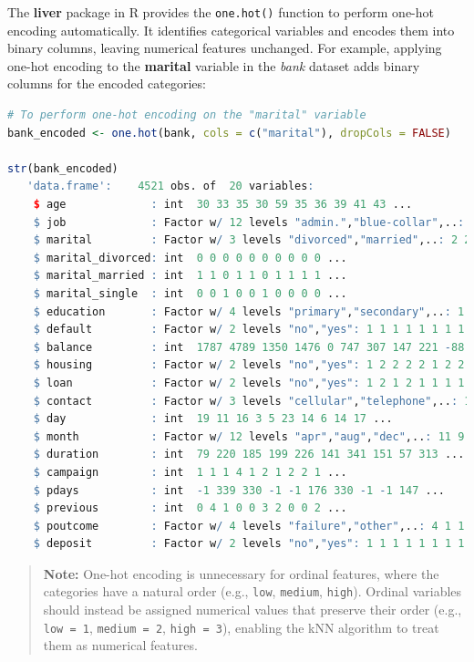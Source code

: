 \documentclass[
]{book}
\newcommand{\passthrough}[1]{#1}
\theoremstyle{definition}
\theoremstyle{definition}
\theoremstyle{definition}
\theoremstyle{definition}
\theoremstyle{remark}
\begin{document}
The \textbf{liver} package in R provides the \passthrough{\lstinline!one.hot()!} function to perform one-hot encoding automatically. It identifies categorical variables and encodes them into binary columns, leaving numerical features unchanged. For example, applying one-hot encoding to the \textbf{marital} variable in the \emph{bank} dataset adds binary columns for the encoded categories:

\begin{lstlisting}[language=R]
# To perform one-hot encoding on the "marital" variable
bank_encoded <- one.hot(bank, cols = c("marital"), dropCols = FALSE)

str(bank_encoded)
   'data.frame':    4521 obs. of  20 variables:
    $ age             : int  30 33 35 30 59 35 36 39 41 43 ...
    $ job             : Factor w/ 12 levels "admin.","blue-collar",..: 11 8 5 5 2 5 7 10 3 8 ...
    $ marital         : Factor w/ 3 levels "divorced","married",..: 2 2 3 2 2 3 2 2 2 2 ...
    $ marital_divorced: int  0 0 0 0 0 0 0 0 0 0 ...
    $ marital_married : int  1 1 0 1 1 0 1 1 1 1 ...
    $ marital_single  : int  0 0 1 0 0 1 0 0 0 0 ...
    $ education       : Factor w/ 4 levels "primary","secondary",..: 1 2 3 3 2 3 3 2 3 1 ...
    $ default         : Factor w/ 2 levels "no","yes": 1 1 1 1 1 1 1 1 1 1 ...
    $ balance         : int  1787 4789 1350 1476 0 747 307 147 221 -88 ...
    $ housing         : Factor w/ 2 levels "no","yes": 1 2 2 2 2 1 2 2 2 2 ...
    $ loan            : Factor w/ 2 levels "no","yes": 1 2 1 2 1 1 1 1 1 2 ...
    $ contact         : Factor w/ 3 levels "cellular","telephone",..: 1 1 1 3 3 1 1 1 3 1 ...
    $ day             : int  19 11 16 3 5 23 14 6 14 17 ...
    $ month           : Factor w/ 12 levels "apr","aug","dec",..: 11 9 1 7 9 4 9 9 9 1 ...
    $ duration        : int  79 220 185 199 226 141 341 151 57 313 ...
    $ campaign        : int  1 1 1 4 1 2 1 2 2 1 ...
    $ pdays           : int  -1 339 330 -1 -1 176 330 -1 -1 147 ...
    $ previous        : int  0 4 1 0 0 3 2 0 0 2 ...
    $ poutcome        : Factor w/ 4 levels "failure","other",..: 4 1 1 4 4 1 2 4 4 1 ...
    $ deposit         : Factor w/ 2 levels "no","yes": 1 1 1 1 1 1 1 1 1 1 ...
\end{lstlisting}

\begin{quote}
\textbf{Note:} One-hot encoding is unnecessary for ordinal features, where the categories have a natural order (e.g., \passthrough{\lstinline!low!}, \passthrough{\lstinline!medium!}, \passthrough{\lstinline!high!}). Ordinal variables should instead be assigned numerical values that preserve their order (e.g., \passthrough{\lstinline!low = 1!}, \passthrough{\lstinline!medium = 2!}, \passthrough{\lstinline!high = 3!}), enabling the kNN algorithm to treat them as numerical features.
\end{quote}
\end{document}
